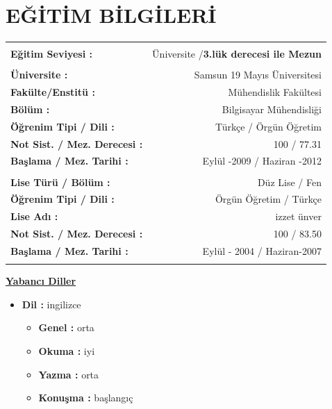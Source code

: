 \documentclass[10pt,a4paper]{article}
\begin{document}
\section{\sc E{\footnotesize Ğ\footnotesize İT\footnotesize İM} B{\footnotesize İLG\footnotesize İLER\footnotesize İ}}
\hspace*{1.6in}\begin{tabular}{lr}
\vspace{0.5 mm}\\
\textbf{Eğitim Seviyesi :} & Üniversite /\textbf{3.lük derecesi ile Mezun} \\
\vspace{0.5 mm}\\
\textbf{Üniversite :} & Samsun 19 Mayıs Üniversitesi \\
\textbf{Fakülte/Enstitü :} & Mühendislik Fakültesi \\
\textbf{Bölüm :} & Bilgisayar Mühendisliği \\
\textbf{Öğrenim Tipi / Dili :} & Türkçe / Örgün Öğretim\\
\textbf{Not Sist. / Mez. Derecesi :} & 100 / 77.31 \\
\textbf{Başlama / Mez. Tarihi :} & Eylül -2009 / Haziran -2012\\
\vspace{0.5 mm}\\
\textbf{Lise Türü / Bölüm :} & Düz Lise / Fen\\
\textbf{Öğrenim Tipi / Dili :} & Örgün Öğretim / Türkçe\\
\textbf{Lise Adı :} & izzet ünver\\
\textbf{Not Sist. / Mez. Derecesi :} & 100 / 83.50\\
\textbf{Başlama / Mez. Tarihi :} & Eylül - 2004 / Haziran-2007\\
\vspace{0.5 mm}\\
\end{tabular}

\underline{\textbf{Yabancı Diller}}
\vspace{0.5 mm}\\
\begin{itemize}
  \item{\textbf{Dil :} ingilizce}
  \begin{itemize}
    \item{\textbf{Genel :} orta}
    \item{\textbf{Okuma :} iyi}
    \item{\textbf{Yazma :} orta}
    \item{\textbf{Konuşma :} başlangıç}
  \end{itemize}
\end{itemize}
\end{document}
